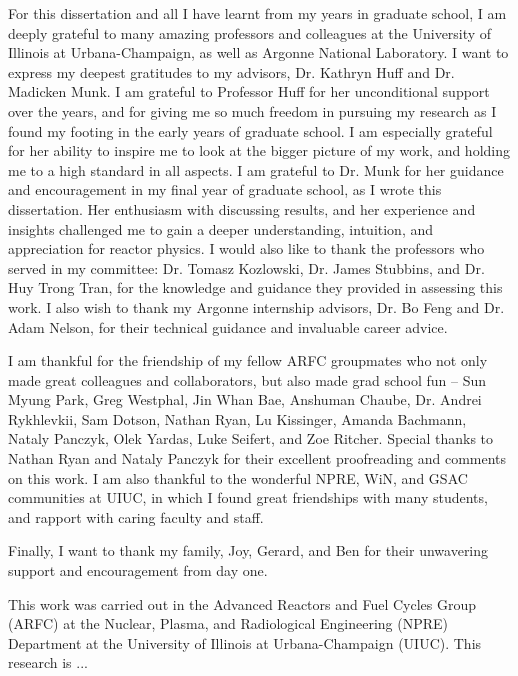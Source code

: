 For this dissertation and all I have learnt from my years in graduate school, 
I am deeply grateful to many amazing professors and colleagues at the University of 
Illinois at Urbana-Champaign, as well as Argonne National Laboratory. 
I want to express my deepest gratitudes to my advisors, Dr. Kathryn Huff and Dr. 
Madicken Munk. 
I am grateful to Professor Huff for her unconditional support over the years, and for 
giving me so much freedom in pursuing my research as I found my footing in the early 
years of graduate school. 
I am especially grateful for her ability to inspire me to look at the bigger picture of 
my work, and holding me to a high standard in all aspects.
I am grateful to Dr. Munk for her guidance and encouragement in my final year 
of graduate school, as I wrote this dissertation. 
Her enthusiasm with discussing results, and her experience and insights challenged me to 
gain a deeper understanding, intuition, and appreciation for reactor physics.  
I would also like to thank the professors who served in my committee: Dr. Tomasz 
Kozlowski, Dr. James Stubbins, and Dr. Huy Trong Tran, for the knowledge and guidance 
they provided in assessing this work. 
I also wish to thank my Argonne internship advisors, Dr. Bo Feng and Dr. Adam Nelson, 
for their technical guidance and invaluable career advice. 

I am thankful for the friendship of my fellow ARFC 
groupmates who not only made great colleagues and collaborators, but also made 
grad school fun -- Sun Myung Park, Greg Westphal, Jin Whan Bae, Anshuman Chaube, 
Dr. Andrei Rykhlevkii, Sam Dotson, Nathan Ryan, Lu Kissinger, Amanda Bachmann, 
Nataly Panczyk, Olek Yardas, Luke Seifert, and Zoe Ritcher. 
Special thanks to Nathan Ryan and Nataly Panczyk for their excellent proofreading 
and comments on this work. 
I am also thankful to the wonderful NPRE, WiN, and GSAC communities at UIUC, in which 
I found great friendships with many students, and rapport with caring faculty and staff. 

Finally, I want to thank my family, Joy, Gerard, and Ben for their unwavering support 
and encouragement from day one. 

This work was carried out in the Advanced Reactors and Fuel Cycles Group (ARFC) at the 
Nuclear, Plasma, and Radiological Engineering (NPRE) Department at the University of 
Illinois at Urbana-Champaign (UIUC). 
This research is ... 
